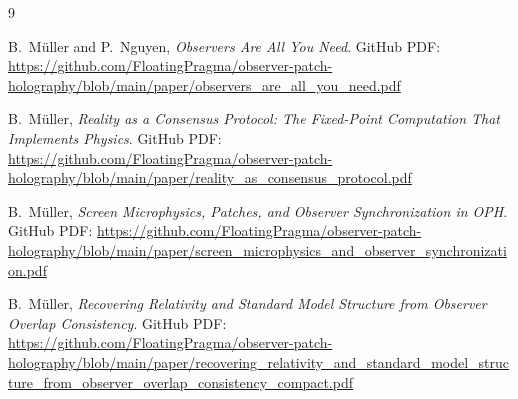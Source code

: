 \documentclass[11pt]{article}
\begin{document}
\appendix


\begin{thebibliography}{9}

B.\ M\"uller and P.\ Nguyen,
\emph{Observers Are All You Need}.
GitHub PDF:
\url{https://github.com/FloatingPragma/observer-patch-holography/blob/main/paper/observers_are_all_you_need.pdf}

B.\ M\"uller,
\emph{Reality as a Consensus Protocol: The Fixed-Point Computation That Implements Physics}.
GitHub PDF:
\url{https://github.com/FloatingPragma/observer-patch-holography/blob/main/paper/reality_as_consensus_protocol.pdf}

B.\ M\"uller,
\emph{Screen Microphysics, Patches, and Observer Synchronization in OPH}.
GitHub PDF:
\url{https://github.com/FloatingPragma/observer-patch-holography/blob/main/paper/screen_microphysics_and_observer_synchronization.pdf}

B.\ M\"uller,
\emph{Recovering Relativity and Standard Model Structure from Observer Overlap Consistency}.
GitHub PDF:
\url{https://github.com/FloatingPragma/observer-patch-holography/blob/main/paper/recovering_relativity_and_standard_model_structure_from_observer_overlap_consistency_compact.pdf}

\end{thebibliography}
\end{document}
